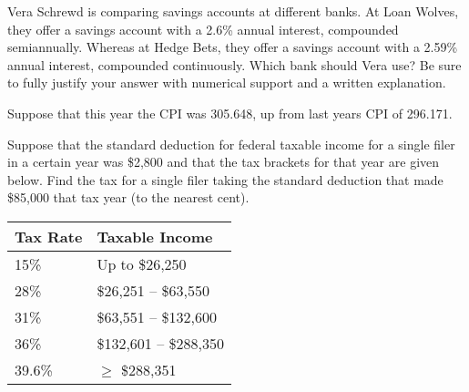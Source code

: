\documentclass[12pt,letterpaper]{exam}
\begin{document}
\begin{questions}
\newpage
\question[10] Vera Schrewd is comparing savings accounts at different banks. At Loan Wolves, they offer a savings account with a 2.6\% annual interest, compounded semiannually. Whereas at Hedge Bets, they offer a savings account with a 2.59\% annual interest, compounded continuously. Which bank should Vera use? Be sure to fully justify your answer with numerical support and a written explanation.



\newpage
\question Suppose that this year the CPI was 305.648, up from last years CPI of 296.171. 



\newpage
\question[15] Suppose that the standard deduction for federal taxable income for a single filer in a certain year was \$2,800 and that the tax brackets for that year are given below. Find the tax for a single filer taking the standard deduction that made \$85,000 that tax year (to the nearest cent). \par
	\begin{table}[!ht]
	\centering
	\begin{tabular}{|l|l|} \hline
	Tax Rate & Taxable Income \\ \hline \hline
	15\% & Up to \$26,250 \\ \hline
	28\% & \$26,251 -- \$63,550 \\ \hline
	31\% & \$63,551 -- \$132,600 \\ \hline
	36\% & \$132,601 -- \$288,350 \\ \hline
	39.6\% & $\geq$ \$288,351 \\ \hline
	\end{tabular}
	\end{table}




\end{questions}
\end{document}
